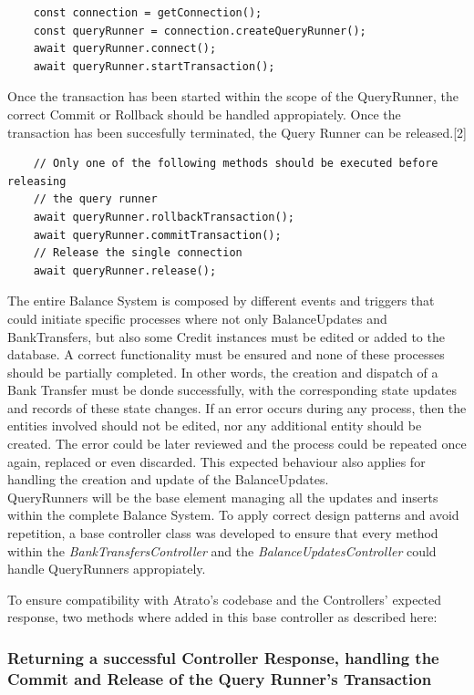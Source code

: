 \begin{verbatim}
    const connection = getConnection();
    const queryRunner = connection.createQueryRunner();
    await queryRunner.connect();
    await queryRunner.startTransaction();
\end{verbatim}

Once the transaction has been started within the scope of the QueryRunner, the correct Commit or Rollback should be handled appropiately. Once the transaction has been succesfully terminated, the Query Runner can be released.[2]

\begin{verbatim}
    // Only one of the following methods should be executed before releasing
    // the query runner
    await queryRunner.rollbackTransaction();
    await queryRunner.commitTransaction();
    // Release the single connection
    await queryRunner.release();
\end{verbatim}

The entire Balance System is composed by different events and triggers that could initiate specific processes where not only BalanceUpdates and BankTransfers, but also some Credit instances must be edited or added to the database. A correct functionality must be ensured and none of these processes should be partially completed. In other words, the creation and dispatch of a Bank Transfer must be donde successfully, with the corresponding state updates and records of these state changes. If an error occurs during any process, then the entities involved should not be edited, nor any additional entity should be created. The error could be later reviewed and the process could be repeated once again, replaced or even discarded. This expected behaviour also applies for handling the creation and update of the BalanceUpdates.\\

QueryRunners will be the base element managing all the updates and inserts within the complete Balance System. To apply correct design patterns and avoid repetition, a base controller class was developed to ensure that every method within the \textit{BankTransfersController} and the \textit{BalanceUpdatesController} could handle QueryRunners appropiately.

To ensure compatibility with Atrato's codebase and the Controllers' expected response, two methods where added in this base controller as described here: 

\subsubsection{Returning a successful Controller Response, handling the Commit and Release of the Query Runner's Transaction}

